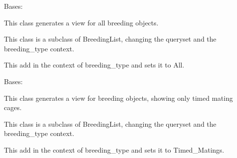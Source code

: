 \documentclass[letterpaper,10pt,english]{sphinxmanual}
\begin{document}
\begin{fulllineitems}
\label{api:mousedb.animal.views.BreedingListAll}
Bases: {\hyperref[api:mousedb.animal.views.BreedingList]{}}

This class generates a view for all breeding objects.

This class is a subclass of BreedingList, changing the queryset and the  breeding\_type context.

\begin{fulllineitems}
\label{api:mousedb.animal.views.BreedingListAll.get_context_data}
This add in the context of breeding\_type and sets it to All.

\end{fulllineitems}


\begin{fulllineitems}
\label{api:mousedb.animal.views.BreedingListAll.queryset}
\end{fulllineitems}


\end{fulllineitems}


\begin{fulllineitems}
\label{api:mousedb.animal.views.BreedingListTimedMating}
Bases: {\hyperref[api:mousedb.animal.views.BreedingList]{}}

This class generates a view for breeding objects, showing only timed mating cages.

This class is a subclass of BreedingList, changing the queryset and the  breeding\_type context.

\begin{fulllineitems}
\label{api:mousedb.animal.views.BreedingListTimedMating.get_context_data}
This add in the context of breeding\_type and sets it to Timed\_Matings.

\end{fulllineitems}


\begin{fulllineitems}
\label{api:mousedb.animal.views.BreedingListTimedMating.queryset}
\end{fulllineitems}


\end{fulllineitems}
\end{document}
